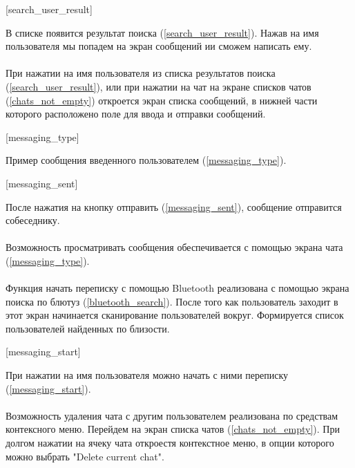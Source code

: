 \documentclass[testmethods]{espd}
\begin{document}
[search_user_result]

В списке появится результат поиска (\ref{search_user_result}). Нажав на имя пользователя мы попадем на экран сообщений ии сможем написать ему.

\paragraph{} %

При нажатии на имя пользователя из списка результатов поиска (\ref{search_user_result}), или при нажатии на чат на экране списков чатов (\ref{chats_not_empty}) откроется экран списка сообщений, в нижней части которого расположено поле для ввода и отправки сообщений.

[messaging_type]

Пример сообщения введенного пользователем (\ref{messaging_type}).

[messaging_sent]

После нажатия на кнопку отправить (\ref{messaging_sent}), сообщение отправится собеседнику.

\paragraph{} %

Возможность просматривать сообщения обеспечивается с помощью экрана чата (\ref{messaging_type}).

\paragraph{} %

Функция начать переписку с помощью Bluetooth реализована с помощью экрана поиска по блютуз (\ref{bluetooth_search}). После того как пользователь заходит в этот экран начинается сканирование пользователей вокруг. Формируется список пользователей найденных по близости.

[messaging_start]

При нажатии на имя пользователя можно начать с ними переписку (\ref{messaging_start}).

\paragraph{} %

Возможность удаления чата с другим пользователем реализована по средствам контексного меню. Перейдем на экран списка чатов (\ref{chats_not_empty}). При долгом нажатии на ячеку чата откроестя контекстное меню, в опции которого можно выбрать "Delete current chat".
\end{document}
